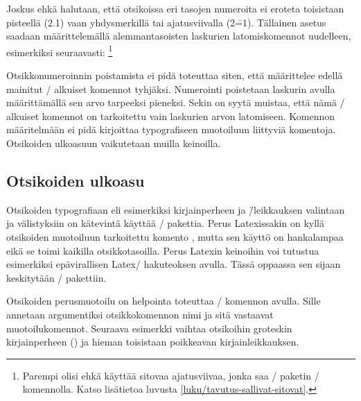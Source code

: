 \noindent
Joskus ehkä halutaan, että otsikoissa eri tasojen numeroita ei eroteta
toisistaan pisteellä (2.1) vaan yhdysmerkillä tai ajatusviivalla
(2\==1). Tällainen asetus saadaan määrittelemällä alemmantasoisten
laskurien latomiskomennot uudelleen, esimerkiksi seuraavasti:%
\footnote{Parempi olisi ehkä käyttää sitovaa ajatusviivaa, jonka saa
  \-/ paketin \komento{==}\-/ komennolla. Katso
  lisätietoa luvusta \ref{luku/tavutus-sallivat-sitovat}.}

\begin{koodilohkosis}
\renewcommand{\thesubsection}{\thesection--\arabic{subsection}}
\renewcommand{\thesubsubsection}{%
  \thesubsection--\arabic{subsubsection}}
\end{koodilohkosis}

\noindent
Otsikkonumeroinnin poistamista ei pidä toteuttaa siten, että määrittelee
edellä mainitut \-/ alkuiset komennot tyhjäksi. Numerointi
poistetaan laskurin  avulla määrittämällä sen arvo
tarpeeksi pieneksi. Sekin on syytä muistaa, että nämä \-/
alkuiset komennot on tarkoitettu vain laskurien arvon latomiseen.
Komennon määritelmään ei pidä kirjoittaa typografiseen muotoiluun
liittyviä komentoja. Otsikoiden ulkoasuun vaikutetaan muilla keinoilla.

\subsection{Otsikoiden ulkoasu}
\label{luku/otsikot-ulkoasu}

Otsikoiden typografiaan eli esimerkiksi kirjainperheen ja \=/leikkauksen
valintaan ja välistyksiin on kätevintä käyttää \-/
pakettia. Perus Latexissakin on kyllä otsikoiden muotoiluun tarkoitettu
komento , mutta sen käyttö on hankalampaa eikä
se toimi kaikilla otsikkotasoilla. Perus Latexin keinoihin voi tutustua
esimerkiksi epävirallisen Latex\-/ hakuteoksen \textcite{unoffref}
avulla. Tässä oppaassa sen sijaan keskitytään \-/
pakettiin.

Otsikoiden perusmuotoilu on helpointa toteuttaa
\-/ komennon avulla. Sille annetaan argumentiksi
otsikkokomennon nimi ja sitä vastaavat muotoilukomennot. Seuraava
esimerkki vaihtaa otsikoihin groteskin kirjainperheen
() ja hieman toisistaan poikkeavan kirjainleikkauksen.

